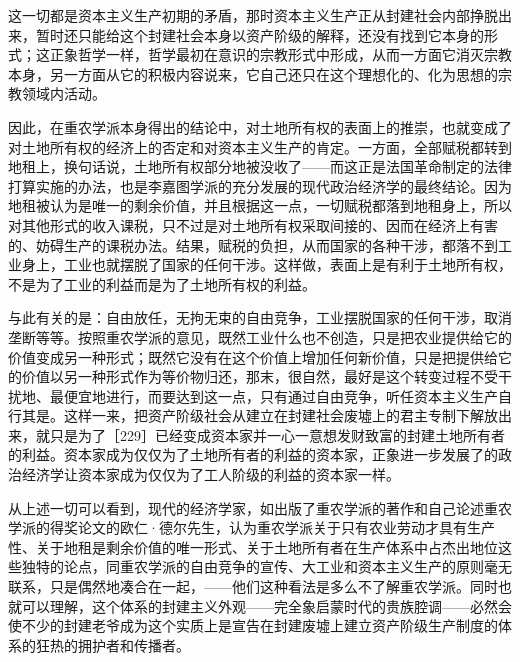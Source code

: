 这一切都是资本主义生产初期的矛盾，那时资本主义生产正从封建社会内部挣脱出来，暂时还只能给这个封建社会本身以资产阶级的解释，还没有找到它本身的形式；这正象哲学一样，哲学最初在意识的宗教形式中形成，从而一方面它消灭宗教本身，另一方面从它的积极内容说来，它自己还只在这个理想化的、化为思想的宗教领域内活动。

因此，在重农学派本身得出的结论中，对土地所有权的表面上的推崇，也就变成了对土地所有权的经济上的否定和对资本主义生产的肯定。一方面，全部赋税都转到地租上，换句话说，土地所有权部分地被没收了——而这正是法国革命制定的法律打算实施的办法，也是李嘉图学派的充分发展的现代政治经济学的最终结论。因为地租被认为是唯一的剩余价值，并且根据这一点，一切赋税都落到地租身上，所以对其他形式的收入课税，只不过是对土地所有权采取间接的、因而在经济上有害的、妨碍生产的课税办法。结果，赋税的负担，从而国家的各种干涉，都落不到工业身上，工业也就摆脱了国家的任何干涉。这样做，表面上是有利于土地所有权，不是为了工业的利益而是为了土地所有权的利益。

与此有关的是：自由放任，无拘无束的自由竞争，工业摆脱国家的任何干涉，取消垄断等等。按照重农学派的意见，既然工业什么也不创造，只是把农业提供给它的价值变成另一种形式；既然它没有在这个价值上增加任何新价值，只是把提供给它的价值以另一种形式作为等价物归还，那末，很自然，最好是这个转变过程不受干扰地、最便宜地进行，而要达到这一点，只有通过自由竞争，听任资本主义生产自行其是。这样一来，把资产阶级社会从建立在封建社会废墟上的君主专制下解放出来，就只是为了［229］已经变成资本家并一心一意想发财致富的封建土地所有者的利益。资本家成为仅仅为了土地所有者的利益的资本家，正象进一步发展了的政治经济学让资本家成为仅仅为了工人阶级的利益的资本家一样。

从上述一切可以看到，现代的经济学家，如出版了重农学派的著作和自己论述重农学派的得奖论文的欧仁·德尔先生，认为重农学派关于只有农业劳动才具有生产性、关于地租是剩余价值的唯一形式、关于土地所有者在生产体系中占杰出地位这些独特的论点，同重农学派的自由竞争的宣传、大工业和资本主义生产的原则毫无联系，只是偶然地凑合在一起，——他们这种看法是多么不了解重农学派。同时也就可以理解，这个体系的封建主义外观——完全象启蒙时代的贵族腔调——必然会使不少的封建老爷成为这个实质上是宣告在封建废墟上建立资产阶级生产制度的体系的狂热的拥护者和传播者。

